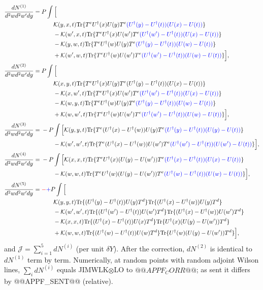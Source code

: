 \documentclass[10pt]{article}
\numberwithin{equation}{section}
\newcommand{\new}[1]{{\color{blue}#1}}
\newcommand{\old}[1]{{\color{red}#1}}
\begin{document}
\begin{align}
\frac{dN^{(1)}}{d^2wd^2w'dy}={}&P\int\Big[\notag\\&\qquad\mathcal K(y,x,t){\rm Tr}\{T^eU^\dagger(x)U(y)T^e\new{(U^\dagger(y)-U^\dagger(t))(U(x)-U(t))}\}\notag\\&\qquad-\mathcal K(w',x,t){\rm Tr}\{T^eU^\dagger(x)U(w')T^e\new{(U^\dagger(w')-U^\dagger(t))(U(x)-U(t))}\}\notag\\
&\qquad-\mathcal K(y,w,t){\rm Tr}\{T^eU^\dagger(w)U(y)T^e\new{(U^\dagger(y)-U^\dagger(t))(U(w)-U(t))}\}\notag\\&\qquad+\mathcal K(w',w,t){\rm Tr}\{T^eU^\dagger(w)U(w')T^e\new{(U^\dagger(w')-U^\dagger(t))(U(w)-U(t))}\}\Big],\notag\\
\frac{dN^{(2)}}{d^2wd^2w'dy}={}&P\int\Big[\notag\\&\qquad\mathcal K(x,y,t){\rm Tr}\{T^eU^\dagger(x)U(y)T^e(U^\dagger(y)-U^\dagger(t))(U(x)-U(t))\}\notag\\&\qquad-\mathcal K(x,w',t){\rm Tr}\{T^eU^\dagger(x)U(w')T^e\new{(U^\dagger(w')-U^\dagger(t))(U(x)-U(t))}\}\notag\\
&\qquad-\mathcal K(w,y,t){\rm Tr}\{T^eU^\dagger(w)U(y)T^e\new{(U^\dagger(y)-U^\dagger(t))(U(w)-U(t))}\}\notag\\&\qquad+\mathcal K(w,w',t){\rm Tr}\{T^eU^\dagger(w)U(w')T^e\new{(U^\dagger(w')-U^\dagger(t))(U(w)-U(t))}\}\Big],\notag\\
\frac{dN^{(3)}}{d^2wd^2w'dy}={}&-P\int\Big[\mathcal K(y,y,t){\rm Tr}\{T^e(U^\dagger(x)-U^\dagger(w))U(y)T^e\new{(U^\dagger(y)-U^\dagger(t))(U(y)-U(t))}\}\notag\\
&\qquad-\mathcal K(w',w',t){\rm Tr}\{T^e(U^\dagger(x)-U^\dagger(w))U(w')T^e\new{(U^\dagger(w')-U^\dagger(t))(U(w')-U(t))}\}\Big],\notag\\
\frac{dN^{(4)}}{d^2wd^2w'dy}={}&-P\int\Big[\mathcal K(x,x,t){\rm Tr}\{T^eU^\dagger(x)(U(y)-U(w'))T^e\new{(U^\dagger(x)-U^\dagger(t))(U(x)-U(t))}\}\notag\\
&\qquad-\mathcal K(w,w,t){\rm Tr}\{T^eU^\dagger(w)(U(y)-U(w'))T^e\new{(U^\dagger(w)-U^\dagger(t))(U(w)-U(t))}\}\Big],\notag\\
\frac{dN^{(5)}}{d^2wd^2w'dy}={}&\old{-}\new{+}P\int\Big[\notag\\
&\qquad\mathcal K(y,y,t){\rm Tr}\{(U^\dagger(y)-U^\dagger(t))U(y)T^d\}{\rm Tr}\{(U^\dagger(x)-U^\dagger(w))U(y)T^d\}\notag\\
&\qquad-\mathcal K(w',w',t){\rm Tr}\{(U^\dagger(w')-U^\dagger(t))U(w')T^d\}{\rm Tr}\{(U^\dagger(x)-U^\dagger(w))U(w')T^d\}\notag\\
&\qquad-\mathcal K(x,x,t){\rm Tr}\{(U^\dagger(x)-U^\dagger(t))U(x)T^d\}{\rm Tr}\{U^\dagger(x)(U(y)-U(w'))T^d\}\notag\\
&\qquad+\mathcal K(w,w,t){\rm Tr}\{(U^\dagger(w)-U^\dagger(t))U(w)T^d\}{\rm Tr}\{U^\dagger(w)(U(y)-U(w'))T^d\}\Big],
\label{eq:JIMc}
\end{align}
and $\mathcal J=\sum_{i=1}^5 dN^{(i)}$ (per unit $\delta Y$). After the correction, $dN^{(2)}$ is identical to $dN^{(1)}$ term by term. Numerically, at random points with random adjoint Wilson lines, $\sum_i dN^{(i)}$ equals JIMWLK$\otimes$LO to $@@APPF_CORR@@$; as sent it differs by @@APPF_SENT@@ (relative).
\end{document}
